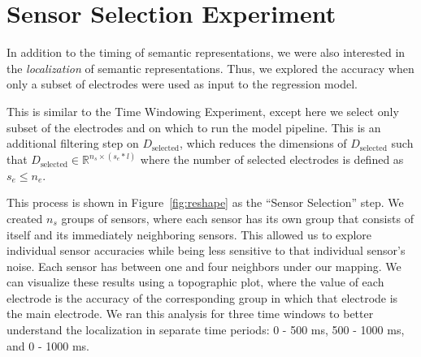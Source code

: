 \section{Sensor Selection Experiment}

In addition to the timing of semantic representations, we were also interested 
in the \emph{localization} of semantic representations. Thus, we explored the 
\tvt accuracy when only a subset of electrodes were used as input to the 
regression model. 

This is similar to the Time Windowing Experiment, except here we select only 
subset of the electrodes and on which to run the model pipeline. This is an 
additional filtering step on $D_{\text{selected}}$, which reduces the 
dimensions of $D_\text{selected}$ such that $D_\text{selected} \in 
\mathbb{R}^{n_s \times (s_e * l)}$ where the number of selected electrodes is 
defined as $s_e \leq n_e$. 

This process is shown in Figure~\ref{fig:reshape} as the ``Sensor Selection'' 
step. We created $n_s$ groups of sensors, where each sensor has its own group 
that consists of itself and its immediately neighboring sensors. This allowed 
us to explore individual sensor accuracies while being less sensitive to that 
individual sensor's noise. Each sensor has between one and four neighbors under 
our mapping. We can visualize these results using a topographic plot, where the 
value of each electrode is the \tvt accuracy of the corresponding group in 
which that electrode is the main electrode. We ran this analysis for three time 
windows to better understand the localization in separate time periods: 0 - 500 
ms, 500 - 1000 ms, and 0 - 1000 ms.
